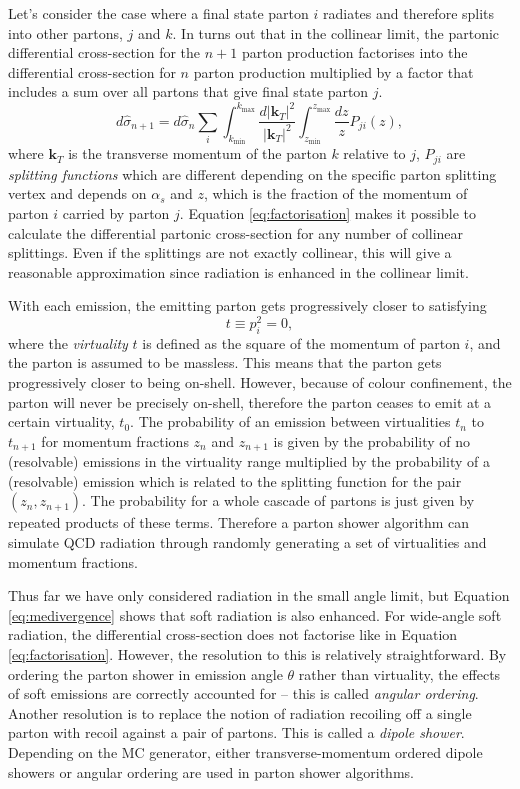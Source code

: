 Let's consider the case where a final state parton $i$ radiates and therefore splits into other partons, $j$ and $k$. In turns out that in the collinear limit, the partonic differential cross-section for the $n+1$ parton production factorises into the differential cross-section for $n$ parton production multiplied by a factor that includes a sum over all partons that give final state parton $j$. 
\begin{equation}\label{eq:factorisation}
    d\hat{\sigma}{}_{n+1}=d\hat{\sigma}_n\sum_i\int_{k_{\text{min}}}^{k_{\text{max}}}\frac{d|\mathbf{k}_{T}|^2}{|\mathbf{k}_{T}|^2}\int_{z_{\text{min}}}^{z_{\text{max}}}\frac{dz}{z}P_{ji}(z),
\end{equation}
where $\mathbf{k}_T$ is the transverse momentum of the parton $k$ relative to $j$, $P_{ji}$ are \textit{splitting functions} which are different depending on the specific parton splitting vertex and depends on $\alpha_s$ and $z$, which is the fraction of the momentum of parton $i$ carried by parton $j$. Equation \ref{eq:factorisation} makes it possible to calculate the differential partonic cross-section for any number of collinear splittings. Even if the splittings are not exactly collinear, this will give a reasonable approximation since radiation is enhanced in the collinear limit. 

With each emission, the emitting parton gets progressively closer to satisfying 
\begin{equation}
    t\equiv p_i^2=0,
\end{equation}
where the \textit{virtuality} $t$ is defined as the square of the momentum of parton $i$, and the parton is assumed to be massless. This means that the parton gets progressively closer to being on-shell. However, because of colour confinement, the parton will never be precisely on-shell, therefore the parton ceases to emit at a certain virtuality, $t_0$. The probability of an emission between virtualities $t_n$ to $t_{n+1}$ for momentum fractions $z_n$ and $z_{n+1}$ is given by the probability of no (resolvable) emissions in the virtuality range multiplied by the probability of a (resolvable) emission which is related to the splitting function for the pair $(z_n, z_{n+1})$. The probability for a whole cascade of partons is just given by repeated products of these terms. Therefore a parton shower algorithm can simulate QCD radiation through randomly generating a set of virtualities and momentum fractions.

Thus far we have only considered radiation in the small angle limit, but Equation \ref{eq:medivergence} shows that soft radiation is also enhanced. For wide-angle soft radiation, the differential cross-section does not factorise like in Equation \ref{eq:factorisation}. However, the resolution to this is relatively straightforward. By ordering the parton shower in emission angle $\theta$ rather than virtuality, the effects of soft emissions are correctly accounted for -- this is called \textit{angular ordering}. Another resolution is to replace the notion of radiation recoiling off a single parton with recoil against a pair of partons. This is called a \textit{dipole shower}. Depending on the MC generator, either transverse-momentum ordered dipole showers or angular ordering are used in parton shower algorithms.


